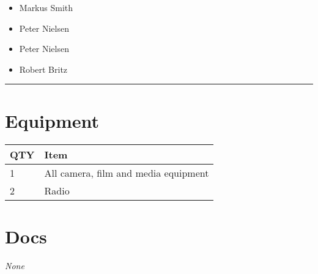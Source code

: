 \documentclass[10pt]{article}
\begin{document}
		

	\begin{multicols}{2}

		\begin{itemize}
									\item Markus Smith
									\item Peter Nielsen
						\end{itemize}

		\vfill\null
		\columnbreak

		\begin{itemize}
									\item Peter Nielsen
									\item Robert Britz
						\end{itemize}

		\vfill\null

		\end{multicols}



			\vspace{0.5cm}
	\hrule
	\vspace{0.5cm}

	\begin{multicols}{2}

		\section*{\faWrench \: Equipment}

		
	\begin{center}
			\begin{tabular}{p{2cm}p{4cm}}


				\textbf{QTY} & \textbf{Item} \\\toprule
												1&All camera, film and media equipment\\\midrule
												2&Radio\\\midrule
								\end{tabular}

			\end{center}

		
		\vfill\null
		\columnbreak

			\section*{\faFile \: Docs}
		 	\textit{None}
	

		\vfill\null

		\end{multicols}
\end{document}
